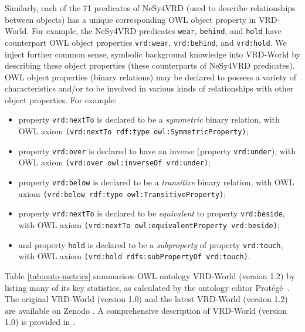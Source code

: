 \documentclass[]{jair}
\begin{document}
Similarly, each of the 71 predicates of NeSy4VRD (used to describe relationships between objects) has a unique corresponding OWL object property in VRD-World.
For example, the NeSy4VRD predicates \texttt{wear}, \texttt{behind}, and \texttt{hold} have counterpart OWL object properties \texttt{vrd:wear}, \texttt{vrd:behind}, and \texttt{vrd:hold}.
We inject further common sense, symbolic background knowledge into VRD-World by describing these object properties (these counterparts of NeSy4VRD predicates).
OWL object properties (binary relations) may be declared to possess a variety of characteristics and/or to be involved in various kinds of relationships with other object properties. 
For example:
\begin{itemize}
    \item property \texttt{vrd:nextTo} is declared to be a \emph{symmetric} binary relation, with OWL axiom \texttt{(vrd:nextTo rdf:type owl:SymmetricProperty)};
    \item property \texttt{vrd:over} is declared to have an inverse (property \texttt{vrd:under}), with OWL axiom \texttt{(vrd:over owl:inverseOf vrd:under)};
    \item property \texttt{vrd:below} is declared to be a \emph{transitive} binary relation, with OWL axiom \texttt{(vrd:below rdf:type owl:TransitiveProperty)};
    \item property \texttt{vrd:nextTo} is declared to be \emph{equivalent} to property \texttt{vrd:beside}, with OWL axiom \texttt{(vrd:nextTo owl:equivalentProperty vrd:beside)};
    \item and property \texttt{hold} is declared to be a \emph{subproperty} of property \texttt{vrd:touch}, with OWL axiom \texttt{(vrd:hold rdfs:subPropertyOf vrd:touch)}.
\end{itemize}

Table \ref{tab:onto-metrics} summarises OWL ontology VRD-World (version 1.2) by listing many of its key statistics, as calculated by the ontology editor Prot\'eg\'e~\cite{DBLP:journals/aimatters/Musen15}.
The original VRD-World (version 1.0) and the latest VRD-World (version 1.2) are available on Zenodo \cite{NeSy4VRD_v11}.
A comprehensive description of VRD-World (version 1.0) is provided in \citet{Herron/2023/nesy4vrd}.
\end{document}

